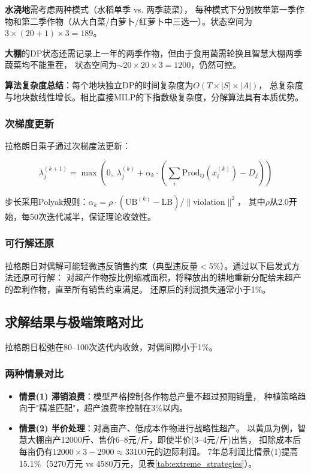 \documentclass[12pt]{ctexart}
\begin{document}
\textbf{水浇地}需考虑两种模式（水稻单季 vs. 两季蔬菜），
每种模式下分别枚举第一季作物和第二季作物（从大白菜/白萝卜/红萝卜中三选一）。状态空间为$3\times(20+1)\times3=189$。

\textbf{大棚}的DP状态还需记录上一年的两季作物，但由于食用菌需轮换且智慧大棚两季蔬菜均不能重茬，
状态空间为$\sim 20\times20\times3 = 1200$，仍然可控。

\textbf{算法复杂度总结}：每个地块独立DP的时间复杂度为$O(T \times |S| \times |A|)$，
总复杂度与地块数线性增长。相比直接MILP的下指数级复杂度，分解算法具有本质优势。

\subsubsection{次梯度更新}

拉格朗日乘子通过次梯度法更新：

\begin{equation}
    \lambda_j^{(k+1)} = \max\left(0,\; \lambda_j^{(k)} + \alpha_k \cdot
    \left(\sum_i \text{Prod}_{ij}(x_i^{(k)}) - D_j\right)\right)
\end{equation}

步长采用Polyak规则：$\alpha_k = \rho \cdot (\text{UB}^{(k)} - \text{LB}) / \|\text{violation}\|^2$，
其中$\rho$从2.0开始，每50次迭代减半，保证理论收敛性。

\subsubsection{可行解还原}

拉格朗日对偶解可能轻微违反销售约束（典型违反量$<$5\%）。通过以下启发式方法还原可行解：
对超产作物按比例缩减面积，将释放出的耕地重新分配给未超产的盈利作物，直至所有销售约束满足。
还原后的利润损失通常小于1\%。

\subsection{求解结果与极端策略对比}

拉格朗日松弛在80--100次迭代内收敛，对偶间隙小于1\%。

\subsubsection{两种情景对比}

\begin{itemize}
    \item \textbf{情景(1) 滞销浪费}：模型严格控制各作物总产量不超过预期销量，
          种植策略趋向于"精准匹配"，超产浪费率控制在3\%以内。
    \item \textbf{情景(2) 半价处理}：对高亩产、低成本作物进行战略性超产。
          以黄瓜为例，智慧大棚亩产12000斤、售价6--8元/斤，即使半价(3--4元/斤)出售，
          扣除成本后每亩仍有$12000\times 3 - 2900 \approx 33100$元的边际利润。
          7年总利润比情景(1)提高15.1\%（5270万元 vs 4580万元，见表\ref{tab:extreme_strategies}）。
\end{itemize}
\end{document}
